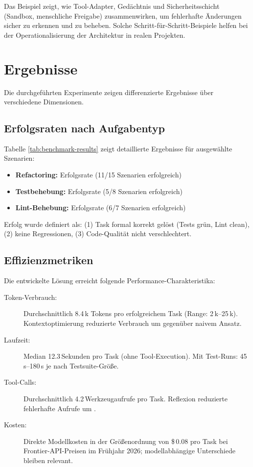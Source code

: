 Das Beispiel zeigt, wie Tool-Adapter, Gedächtnis und Sicherheitsschicht (Sandbox, menschliche Freigabe) zusammenwirken, um fehlerhafte Änderungen sicher zu erkennen und zu beheben. Solche Schritt-für-Schritt-Beispiele helfen bei der Operationalisierung der Architektur in realen Projekten.

\section{Ergebnisse}

Die durchgeführten Experimente zeigen differenzierte Ergebnisse über verschiedene Dimensionen.

\subsection{Erfolgsraten nach Aufgabentyp}

Tabelle \ref{tab:benchmark-results} zeigt detaillierte Ergebnisse für ausgewählte Szenarien:

\begin{sloppypar}
\begin{itemize}
  \item \textbf{Refactoring:}  Erfolgsrate (11/15 Szenarien erfolgreich)
  \item \textbf{Testbehebung:}  Erfolgsrate (5/8 Szenarien erfolgreich)
  \item \textbf{Lint-Behebung:}  Erfolgsrate (6/7 Szenarien erfolgreich)
\end{itemize}
\end{sloppypar}

Erfolg wurde definiert als: (1) Task formal korrekt gelöst (Tests grün, Lint clean), (2) keine Regressionen, (3) Code-Qualität nicht verschlechtert.

\subsection{Effizienzmetriken}

Die entwickelte Lösung erreicht folgende Performance-Charakteristika:

\begin{sloppypar}
\begin{description}
  \item[Token-Verbrauch:] Durchschnittlich 8.4\,k Tokens pro erfolgreichem Task (Range: 2\,k--25\,k). Kontextoptimierung reduzierte Verbrauch um  gegenüber naivem Ansatz.
  
  \item[Laufzeit:] Median 12.3\,Sekunden pro Task (ohne Tool-Execution). Mit Test-Runs: 45\,s--180\,s je nach Testsuite-Größe.
  
  \item[Tool-Calls:] Durchschnittlich 4.2\,Werkzeugaufrufe pro Task. Reflexion reduzierte fehlerhafte Aufrufe um .
  
  \item[Kosten:] Direkte Modellkosten in der Größenordnung von \$\,0.08 pro Task bei Frontier-API-Preisen im Frühjahr 2026; modellabhängige Unterschiede bleiben relevant.
\end{description}
\end{sloppypar}

